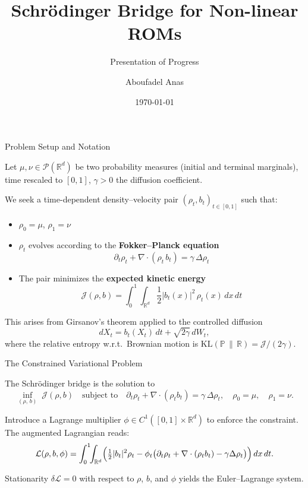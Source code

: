 \documentclass[aspectratio=169]{beamer}
\title[Schrödinger Bridge ROMs]{Schrödinger Bridge for Non-linear ROMs}
\subtitle{Presentation of Progress}
\author{Aboufadel Anas}
\date{\today}
\begin{document}
\begin{frame}
    \titlepage
\end{frame}

\begin{frame}{Problem Setup and Notation}

Let $\mu, \nu \in \mathcal{P}(\mathbb{R}^d)$ be two probability measures (initial and terminal marginals),
time rescaled to $[0,1]$, $\gamma > 0$ the diffusion coefficient.

We seek a time-dependent density–velocity pair $(\rho_t, b_t)_{t\in[0,1]}$ such that:
\begin{itemize}
    \item $\rho_0 = \mu$,\; $\rho_1 = \nu$
    \item $\rho_t$ evolves according to the \textbf{Fokker–Planck equation}
    \[
        \partial_t \rho_t + \nabla \cdot (\rho_t\, b_t) = \gamma\,\Delta \rho_t
    \]
    \item The pair minimizes the \textbf{expected kinetic energy}
    \[
        \mathcal{J}(\rho, b) = \int_0^1 \!\!\int_{\mathbb{R}^d} \frac{1}{2}|b_t(x)|^2\,\rho_t(x)\,dx\,dt
    \]
\end{itemize}

This arises from Girsanov's theorem applied to the controlled diffusion
\[
    dX_t = b_t(X_t)\,dt + \sqrt{2\gamma}\,dW_t,
\]
where the relative entropy w.r.t.\ Brownian motion is $\mathrm{KL}(\mathbb{P}\,\|\,\mathbb{R}) = \mathcal{J}/(2\gamma)$.

\end{frame}

\begin{frame}{The Constrained Variational Problem}

The Schrödinger bridge is the solution to
\[
    \inf_{(\rho,\, b)}\; \mathcal{J}(\rho, b)
    \quad\text{subject to}\quad
    \partial_t \rho_t + \nabla\!\cdot(\rho_t b_t) = \gamma\,\Delta\rho_t,\quad
    \rho_0 = \mu,\quad \rho_1 = \nu.
\]

Introduce a Lagrange multiplier $\phi \in C^1([0,1]\times\mathbb{R}^d)$ to enforce the constraint.
The augmented Lagrangian reads:
\[
    \mathcal{L}(\rho,b,\phi) = \int_0^1\!\!\int_{\mathbb{R}^d}
    \Bigl(
        \tfrac{1}{2}|b_t|^2\rho_t
        - \phi_t\bigl(\partial_t\rho_t + \nabla\cdot(\rho_t b_t) - \gamma\Delta\rho_t\bigr)
    \Bigr)\,dx\,dt.
\]

Stationarity $\delta\mathcal{L} = 0$ with respect to $\rho$, $b$, and $\phi$ yields the Euler–Lagrange system.

\end{frame}
\end{document}
